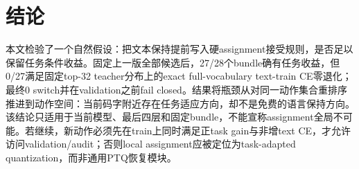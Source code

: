 \section{结论}

本文检验了一个自然假设：把文本保持提前写入硬assignment接受规则，是否足以保留任务条件收益。固定上一版全部候选后，27/28个bundle确有任务收益，但0/27满足固定top-32 teacher分布上的exact full-vocabulary text-train CE零退化；最终0 switch并在validation之前fail closed。结果将瓶颈从对同一动作集合重排序推进到动作空间：当前码字附近存在任务适应方向，却不是免费的语言保持方向。该结论只适用于当前模型、最后四层和固定bundle，不能宣称assignment全局不可能。若继续，新动作必须先在train上同时满足正task gain与非增text CE，才允许访问validation/audit；否则local assignment应被定位为task-adapted quantization，而非通用PTQ恢复模块。
